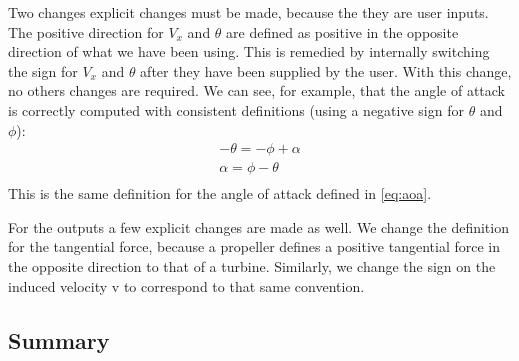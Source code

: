 \documentclass{article}
\begin{document}
Two changes explicit changes must be made, because the they are user inputs.   The positive direction for $V_x$ and $\theta$ are defined as positive in the opposite direction of what we have been using.  This is remedied by internally switching the sign for $V_x$ and $\theta$ after they have been supplied by the user.  With this change, no others changes are required.  We can see, for example, that the angle of attack is correctly computed with consistent definitions (using a negative sign for $\theta$ and $\phi$):
\begin{equation}
    \begin{aligned}
        -\theta = -\phi + \alpha\\
        \alpha = \phi - \theta\\
    \end{aligned}
\end{equation}
This is the same definition for the angle of attack defined in \cref{eq:aoa}.

For the outputs a few explicit changes are made as well.  We change the definition for the tangential force, because a propeller defines a positive tangential force in the opposite direction to that of a turbine.  Similarly, we change the sign on the induced velocity v to correspond to that same convention.




\subsection{Summary}
\end{document}
